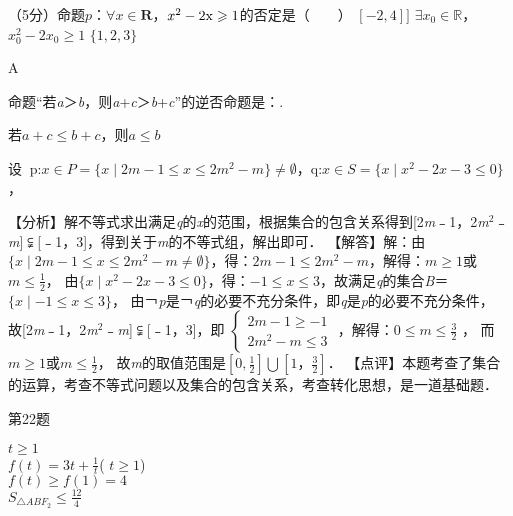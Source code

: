   \item
  （5分）命题$p$：$\forall x\in \mathbf{R}$，$x^2-2\rm x\geqslant 1$的否定是（　　）\xz
    \xx{$[-1,3]]$}
      {$[-2,4]]$}
      {$\exists x_0 \in \mathbb{R}$，$x_0^2-2x_0\geqslant 1$}
      {$\{1,2,3\}$}
    \begin{answer}
      A
    \end{answer}
  \item
    命题``若\textit{a}＞\textit{b}，则\textit{a}+\textit{c}＞\textit{b}+\textit{c}''的逆否命题是：\tk.
    \begin{answer}
      若$a+c\leqslant b+c$，则$a\leqslant b$
    \end{answer}
  \item
    设p:$x\in P=\{ x \mid 2m-1\leqslant x\leqslant 2m^2-m\} \neq \emptyset$，q:$x\in S=\{ x \mid x^2-2x-3\leqslant0 \}$ ，
    \begin{answer}
      【分析】解不等式求出满足\textit{q}的\textit{x}的范围，根据集合的包含关系得到[2\textit{m}﹣1，2\textit{m}${}^{2}$﹣\textit{m}]$\mathrm{\subsetneqq}$[﹣1，3]，得到关于\textit{m}的不等式组，解出即可．
      【解答】解：由$\{ x \mid 2m-1\leqslant x\leqslant 2m^2-m \neq \emptyset \}$，得：$2m-1\leqslant 2m^2-m$，解得：$ m\geqslant 1$或$m\leqslant \frac12$，
            由$\{ x \mid x^2-2x-3\leqslant0 \}$，得：$-1\leqslant x\leqslant 3$，故满足\textit{q}的集合\textit{B}＝$\{ x \mid -1\leqslant x\leqslant 3\}$，
            由￢\textit{p}是￢\textit{q}的必要不充分条件，即\textit{q}是\textit{p}的必要不充分条件，
            故[2\textit{m}﹣1，2\textit{m}${}^{2}$﹣\textit{m}]$\mathrm{\subsetneqq}$[﹣1，3]，即
            $\left\{\begin{aligned}
              2m-1 \geqslant -1\\
              2m^2-m \leqslant 3
            \end{aligned}\right.$
            ，解得：$0\leqslant m\leqslant \frac32$ ，
            而$m\geqslant1$或$m\leqslant\frac12$，
            故\textit{m}的取值范围是$[0,\frac12]\bigcup [1，\frac32]$．
      【点评】本题考查了集合的运算，考查不等式问题以及集合的包含关系，考查转化思想，是一道基础题．
    \end{answer}
  \item
    第22题
    \begin{answer}
      $t\geqslant 1$\\
      $f(t)=3t+\frac1t$( $t\geqslant 1$)\\
      $f(t)\geqslant f(1)=4$\\
      $S_{\triangle ABF_2}\leqslant \frac{12}4$

    \end{answer}










 